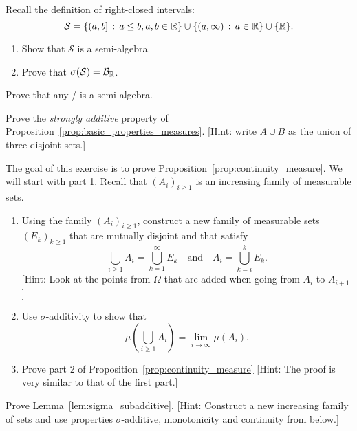 \begin{problem}\label{prb:right_closed_intervals}
Recall the definition of right-closed intervals:
\[
	\mathcal{S} = \{(a,b] \, : \, a\le b, a, b \in \mathbb R\} \cup \{(a,\infty) \, : \, a \in \mathbb R\} \cup \{\mathbb R\}.
\]
\begin{enumerate}[label=(\alph*)]
\item Show that $\mathcal{S}$ is a semi-algebra.
\item Prove that $\sigma(\mathcal{S}) = \mathcal B_{\mathbb R}$.
\end{enumerate}

\end{problem}

\begin{problem}\label{prb:sigalg_is_semialg}
Prove that any \sigalg/ is a semi-algebra.
\end{problem}


\begin{problem}\label{prb:strongly_additive}
Prove the \emph{strongly additive} property of Proposition~\ref{prop:basic_properties_measures}. [Hint: write $A \cup B$ as the union of three disjoint sets.]
\end{problem}


\begin{problem}\label{prb:proof_continuity}
The goal of this exercise is to prove Proposition~\ref{prop:continuity_measure}. We will start with part 1. Recall that $(A_i)_{i \ge 1}$ is an increasing family of measurable sets.


\begin{enumerate}[label=(\alph*)]
\item Using the family $(A_i)_{i \ge 1}$, construct a new family of measurable sets $(E_k)_{k \ge 1}$ that are mutually disjoint and that satisfy
\[
	\bigcup_{i \ge 1} A_i = \bigcup_{k = 1}^\infty E_k \quad \text{and} \quad A_i = \bigcup_{k = i}^k E_k.
\] 
[Hint: Look at the points from $\Omega$ that are added when going from $A_i$ to $A_{i + 1}$]

\item Use $\sigma$-additivity to show that
\[
	\mu(\bigcup_{i \ge 1} A_i) = \lim_{i \to \infty} \mu(A_i).
\]
\item Prove part 2 of Proposition~\ref{prop:continuity_measure} [Hint: The proof is very similar to that of the first part.]
\end{enumerate}

\end{problem}


\begin{problem}\label{prb:sigma_subadditive}
Prove Lemma~\ref{lem:sigma_subadditive}. [Hint: Construct a new increasing family of sets and use properties $\sigma$-additive, monotonicity and continuity from below.] 
\end{problem}


